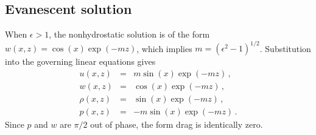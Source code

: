 \documentclass[12pt]{article}
\begin{document}
\subsection{Evanescent solution}

When $\epsilon>1$, the nonhydrostatic solution is of the form
$w(x,z) = \cos(x)\exp(-m z)$, which implies $m = (\epsilon^2-1)^{1/2}$.  Substitution into
the governing linear equations gives
\begin{eqnarray*}
u(x,z) &=& m \sin(x) \exp(-m z)\,,\\
w(x,z) &=& \cos(x) \exp(-m z)\,,\\
\rho(x,z) &=& \sin(x) \exp(-m z)\,,\\
p(x,z) &=& -m \sin(x) \exp(-m z)\,.
\end{eqnarray*}
Since $p$ and $w$ are $\pi/2$ out of phase, the form drag is identically zero.
 
\end{document}
